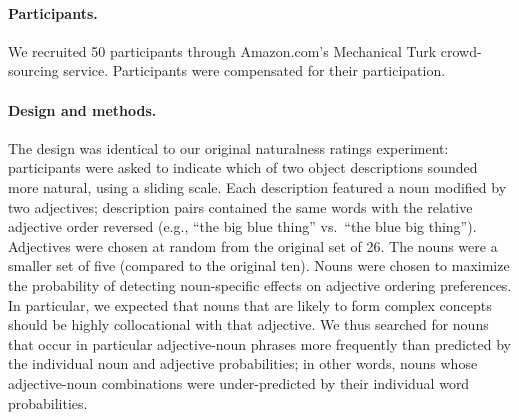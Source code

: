 \documentclass[12pt]{article}
\begin{document}
\paragraph{Participants.}

We recruited 50 participants through Amazon.com's Mechanical Turk crowd-sourcing service. Participants were compensated for their participation.

\paragraph{Design and methods.}

The design was identical to our original naturalness ratings experiment: participants were asked to indicate which of two object descriptions sounded more natural, using a sliding scale. Each description featured a noun modified by two adjectives; description pairs contained the same words with the relative adjective order reversed (e.g., ``the big blue thing'' vs.~``the blue big thing''). Adjectives were chosen at random from the original set of 26. The nouns were a smaller set of five (compared to the original ten). Nouns were chosen to maximize the probability of detecting noun-specific effects on adjective ordering preferences. In particular, we expected that nouns that are likely to form complex concepts should be 
highly collocational with that adjective. We thus searched for nouns that occur in particular adjective-noun phrases more frequently than predicted by the individual noun and adjective probabilities; in other words, nouns whose adjective-noun combinations were under-predicted by their individual word probabilities. 
\end{document}
